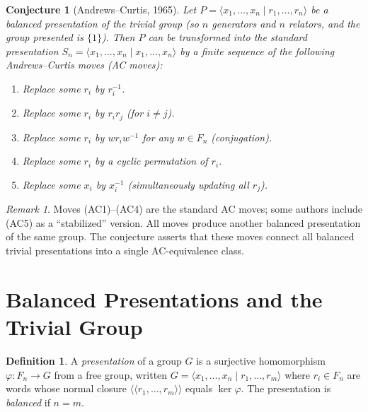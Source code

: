 \documentclass[12pt,a4paper]{amsart}
\newtheorem{conjecture}[theorem]{Conjecture}
\theoremstyle{definition}
\newtheorem{definition}[theorem]{Definition}
\theoremstyle{remark}
\newtheorem{remark}[theorem]{Remark}
\begin{document}
\begin{conjecture}[Andrews--Curtis, 1965]\label{conj:AC}
Let $P = \langle x_1,\ldots,x_n \mid r_1,\ldots,r_n \rangle$ be a balanced
presentation of the trivial group (so $n$ generators and $n$ relators, and the
group presented is $\{1\}$). Then $P$ can be transformed into the standard
presentation $S_n = \langle x_1,\ldots,x_n \mid x_1,\ldots,x_n \rangle$
by a finite sequence of the following \emph{Andrews--Curtis moves} (AC moves):
\begin{enumerate}[label=(AC\arabic*)]
  \item Replace some $r_i$ by $r_i^{-1}$.
  \item Replace some $r_i$ by $r_i r_j$ (for $i \neq j$).
  \item Replace some $r_i$ by $w r_i w^{-1}$ for any $w \in F_n$ (conjugation).
  \item Replace some $r_i$ by a cyclic permutation of $r_i$.
  \item Replace some $x_i$ by $x_i^{-1}$ (simultaneously updating all $r_j$).
\end{enumerate}
\end{conjecture}

\begin{remark}
Moves (AC1)--(AC4) are the standard AC moves; some authors include (AC5) as a
``stabilized'' version. All moves produce another balanced presentation of the
same group. The conjecture asserts that these moves connect all balanced trivial
presentations into a single AC-equivalence class.
\end{remark}

\section{Balanced Presentations and the Trivial Group}

\begin{definition}
A \emph{presentation} of a group $G$ is a surjective homomorphism $\varphi \colon F_n \to G$
from a free group, written $G = \langle x_1,\ldots,x_n \mid r_1,\ldots,r_m \rangle$
where $r_i \in F_n$ are words whose normal closure $\langle\!\langle r_1,\ldots,r_m \rangle\!\rangle$
equals $\ker \varphi$. The presentation is \emph{balanced} if $n = m$.
\end{definition}
\end{document}
